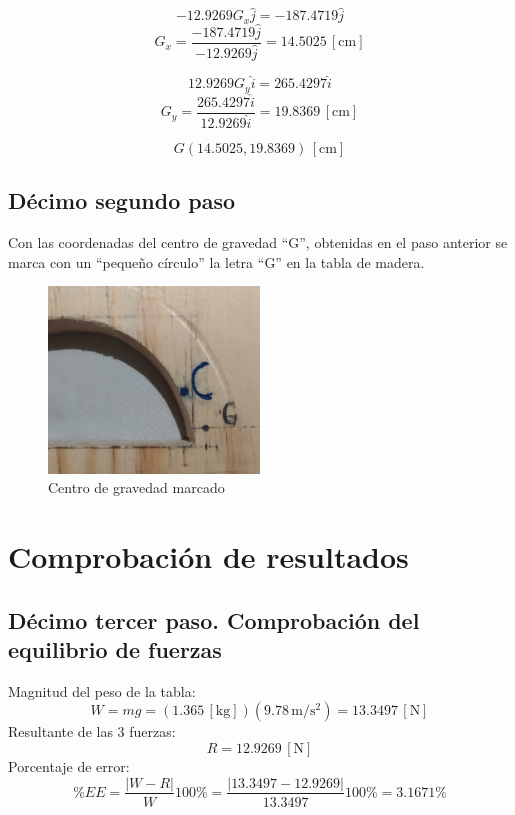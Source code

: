 \documentclass[12pt, titlepage]{report}
\newcommand{\unit}[1]{\ensuremath{\, \mathrm{#1}}}
\begin{document}
    $$- 12.9269G_x\hat{j} = - 187.4719\hat{j}$$
    $$G_x = \frac{- 187.4719\hat{j}}{- 12.9269\hat{j}} = 14.5025 \unit{[cm]}$$

    $$12.9269G_y\hat{i} = 265.4297\hat{i}$$
    $$G_y = \frac{265.4297\hat{i}}{12.9269\hat{i}} = 19.8369 \unit{[cm]}$$

    $$G(14.5025, 19.8369) \unit{[cm]}$$

    \subsection*{Décimo segundo paso}
    Con las coordenadas del centro de gravedad ``G'', obtenidas en el paso anterior se marca con un ``pequeño círculo'' la letra ``G'' en la tabla de madera.

    \begin{figure}[ht]
        \centering
        \includegraphics[width=0.5\textwidth]{PuntoG.jpg}
        \caption{Centro de gravedad marcado}
    \end{figure}

    \hfill
    \section{Comprobación de resultados}
    \subsection*{Décimo tercer paso. Comprobación del equilibrio de fuerzas}
    Magnitud del peso de la tabla: 
    $$W=mg=(1.365 \unit{[kg]})(9.78 \unit{m/s^2}) = 13.3497 \unit{[N]}$$
    Resultante de las 3 fuerzas: 
    $$R = 12.9269 \unit{[N]}$$
    Porcentaje de error: 
    $$\%EE=\frac{|W-R|}{W}100\%=\frac{|13.3497 - 12.9269|}{13.3497}100\% = 3.1671\%$$
\end{document}

